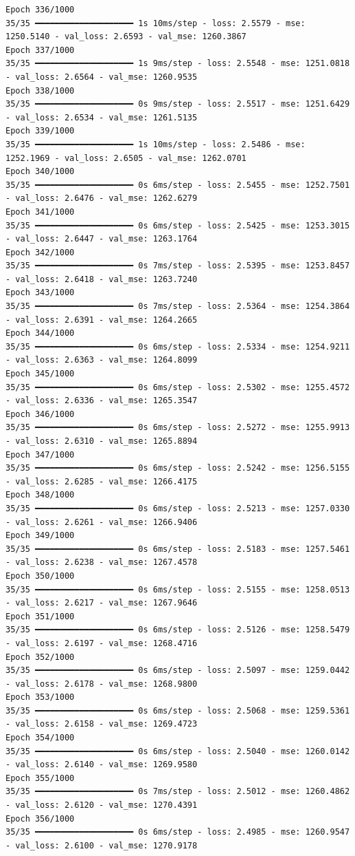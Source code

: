 \documentclass[
  letterpaper,
  DIV=11,
  numbers=noendperiod]{scrreprt}
\begin{document}
\begin{verbatim}
Epoch 336/1000
35/35 ━━━━━━━━━━━━━━━━━━━━ 1s 10ms/step - loss: 2.5579 - mse: 1250.5140 - val_loss: 2.6593 - val_mse: 1260.3867
Epoch 337/1000
35/35 ━━━━━━━━━━━━━━━━━━━━ 1s 9ms/step - loss: 2.5548 - mse: 1251.0818 - val_loss: 2.6564 - val_mse: 1260.9535
Epoch 338/1000
35/35 ━━━━━━━━━━━━━━━━━━━━ 0s 9ms/step - loss: 2.5517 - mse: 1251.6429 - val_loss: 2.6534 - val_mse: 1261.5135
Epoch 339/1000
35/35 ━━━━━━━━━━━━━━━━━━━━ 1s 10ms/step - loss: 2.5486 - mse: 1252.1969 - val_loss: 2.6505 - val_mse: 1262.0701
Epoch 340/1000
35/35 ━━━━━━━━━━━━━━━━━━━━ 0s 6ms/step - loss: 2.5455 - mse: 1252.7501 - val_loss: 2.6476 - val_mse: 1262.6279
Epoch 341/1000
35/35 ━━━━━━━━━━━━━━━━━━━━ 0s 6ms/step - loss: 2.5425 - mse: 1253.3015 - val_loss: 2.6447 - val_mse: 1263.1764
Epoch 342/1000
35/35 ━━━━━━━━━━━━━━━━━━━━ 0s 7ms/step - loss: 2.5395 - mse: 1253.8457 - val_loss: 2.6418 - val_mse: 1263.7240
Epoch 343/1000
35/35 ━━━━━━━━━━━━━━━━━━━━ 0s 7ms/step - loss: 2.5364 - mse: 1254.3864 - val_loss: 2.6391 - val_mse: 1264.2665
Epoch 344/1000
35/35 ━━━━━━━━━━━━━━━━━━━━ 0s 6ms/step - loss: 2.5334 - mse: 1254.9211 - val_loss: 2.6363 - val_mse: 1264.8099
Epoch 345/1000
35/35 ━━━━━━━━━━━━━━━━━━━━ 0s 6ms/step - loss: 2.5302 - mse: 1255.4572 - val_loss: 2.6336 - val_mse: 1265.3547
Epoch 346/1000
35/35 ━━━━━━━━━━━━━━━━━━━━ 0s 6ms/step - loss: 2.5272 - mse: 1255.9913 - val_loss: 2.6310 - val_mse: 1265.8894
Epoch 347/1000
35/35 ━━━━━━━━━━━━━━━━━━━━ 0s 6ms/step - loss: 2.5242 - mse: 1256.5155 - val_loss: 2.6285 - val_mse: 1266.4175
Epoch 348/1000
35/35 ━━━━━━━━━━━━━━━━━━━━ 0s 6ms/step - loss: 2.5213 - mse: 1257.0330 - val_loss: 2.6261 - val_mse: 1266.9406
Epoch 349/1000
35/35 ━━━━━━━━━━━━━━━━━━━━ 0s 6ms/step - loss: 2.5183 - mse: 1257.5461 - val_loss: 2.6238 - val_mse: 1267.4578
Epoch 350/1000
35/35 ━━━━━━━━━━━━━━━━━━━━ 0s 6ms/step - loss: 2.5155 - mse: 1258.0513 - val_loss: 2.6217 - val_mse: 1267.9646
Epoch 351/1000
35/35 ━━━━━━━━━━━━━━━━━━━━ 0s 6ms/step - loss: 2.5126 - mse: 1258.5479 - val_loss: 2.6197 - val_mse: 1268.4716
Epoch 352/1000
35/35 ━━━━━━━━━━━━━━━━━━━━ 0s 6ms/step - loss: 2.5097 - mse: 1259.0442 - val_loss: 2.6178 - val_mse: 1268.9800
Epoch 353/1000
35/35 ━━━━━━━━━━━━━━━━━━━━ 0s 6ms/step - loss: 2.5068 - mse: 1259.5361 - val_loss: 2.6158 - val_mse: 1269.4723
Epoch 354/1000
35/35 ━━━━━━━━━━━━━━━━━━━━ 0s 6ms/step - loss: 2.5040 - mse: 1260.0142 - val_loss: 2.6140 - val_mse: 1269.9580
Epoch 355/1000
35/35 ━━━━━━━━━━━━━━━━━━━━ 0s 7ms/step - loss: 2.5012 - mse: 1260.4862 - val_loss: 2.6120 - val_mse: 1270.4391
Epoch 356/1000
35/35 ━━━━━━━━━━━━━━━━━━━━ 0s 6ms/step - loss: 2.4985 - mse: 1260.9547 - val_loss: 2.6100 - val_mse: 1270.9178

\end{verbatim}
\end{document}
